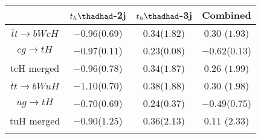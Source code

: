 \centering
\begin{tabular}{cccc} \toprule\toprule
 & $t_h\thadhad$-2j & $t_h\thadhad$-3j & Combined\\\midrule
$\bar{t}t\to bWcH$ & $-0.96$($0.69$) & $0.34$($1.82$)& $0.30$ ($1.93$)\\
$cg\to tH$         & $-0.97$($0.11$) & $0.23$($0.08$)& $-0.62$($0.13$)\\
tcH merged         & $-0.96$($0.78$) & $0.34$($1.87$)& $0.26$ ($1.99$)\\
$\bar{t}t\to bWuH$ & $-1.10$($0.70$) & $0.38$($1.88$)& $0.30$ ($1.98$)\\
$ug\to tH$         & $-0.70$($0.69$) & $0.24$($0.37$)& $-0.49$($0.75$)\\
tuH merged         & $-0.90$($1.25$) & $0.36$($2.13$)& $0.11$ ($2.33$)\\
\bottomrule\bottomrule\\
\end{tabular}






